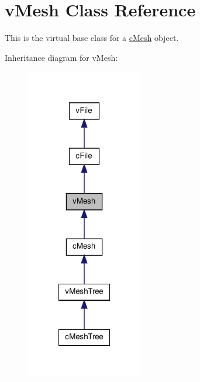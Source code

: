 \hypertarget{classv_mesh}{
\section{vMesh Class Reference}
\label{classv_mesh}
}


This is the virtual base class for a \hyperlink{classc_mesh}{cMesh} object.  




Inheritance diagram for vMesh:
\nopagebreak
\begin{figure}[H]
\begin{center}
\leavevmode
\includegraphics[width=144pt]{classv_mesh__inherit__graph}
\end{center}
\end{figure}


